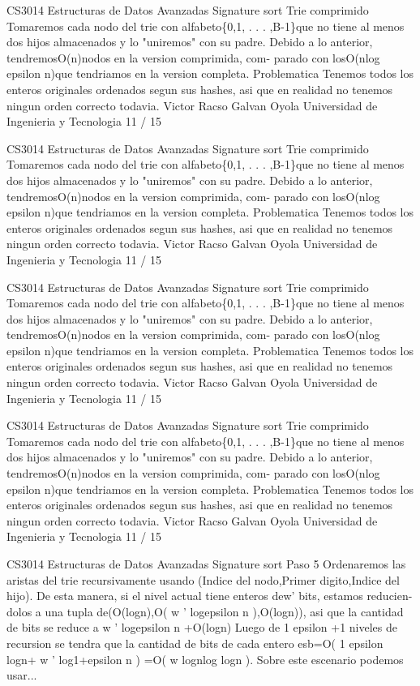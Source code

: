 \begin{description}[leftmargin=!,labelwidth=4.2em,style=nextline]
\item[Pag. 36] CS3014 Estructuras de Datos Avanzadas Signature sort Trie comprimido Tomaremos cada nodo del trie con alfabeto\{0,1, . . . ,B-1\}que no tiene al menos dos hijos almacenados y lo "uniremos" con su padre. Debido a lo anterior, tendremosO(n)nodos en la version comprimida, com- parado con losO(nlog epsilon n)que tendriamos en la version completa. Problematica Tenemos todos los enteros originales ordenados segun sus hashes, asi que en realidad no tenemos ningun orden correcto todavia. Victor Racso Galvan Oyola Universidad de Ingenieria y Tecnologia 11 / 15
\item[Pag. 37] CS3014 Estructuras de Datos Avanzadas Signature sort Trie comprimido Tomaremos cada nodo del trie con alfabeto\{0,1, . . . ,B-1\}que no tiene al menos dos hijos almacenados y lo "uniremos" con su padre. Debido a lo anterior, tendremosO(n)nodos en la version comprimida, com- parado con losO(nlog epsilon n)que tendriamos en la version completa. Problematica Tenemos todos los enteros originales ordenados segun sus hashes, asi que en realidad no tenemos ningun orden correcto todavia. Victor Racso Galvan Oyola Universidad de Ingenieria y Tecnologia 11 / 15
\item[Pag. 38] CS3014 Estructuras de Datos Avanzadas Signature sort Trie comprimido Tomaremos cada nodo del trie con alfabeto\{0,1, . . . ,B-1\}que no tiene al menos dos hijos almacenados y lo "uniremos" con su padre. Debido a lo anterior, tendremosO(n)nodos en la version comprimida, com- parado con losO(nlog epsilon n)que tendriamos en la version completa. Problematica Tenemos todos los enteros originales ordenados segun sus hashes, asi que en realidad no tenemos ningun orden correcto todavia. Victor Racso Galvan Oyola Universidad de Ingenieria y Tecnologia 11 / 15
\item[Pag. 39] CS3014 Estructuras de Datos Avanzadas Signature sort Trie comprimido Tomaremos cada nodo del trie con alfabeto\{0,1, . . . ,B-1\}que no tiene al menos dos hijos almacenados y lo "uniremos" con su padre. Debido a lo anterior, tendremosO(n)nodos en la version comprimida, com- parado con losO(nlog epsilon n)que tendriamos en la version completa. Problematica Tenemos todos los enteros originales ordenados segun sus hashes, asi que en realidad no tenemos ningun orden correcto todavia. Victor Racso Galvan Oyola Universidad de Ingenieria y Tecnologia 11 / 15
\item[Pag. 40] CS3014 Estructuras de Datos Avanzadas Signature sort Paso 5 Ordenaremos las aristas del trie recursivamente usando (Indice del nodo,Primer digito,Indice del hijo). De esta manera, si el nivel actual tiene enteros dew' bits, estamos reducien- dolos a una tupla de(O(logn),O( w ' logepsilon n ),O(logn)), asi que la cantidad de bits se reduce a w ' logepsilon n +O(logn) Luego de 1 epsilon +1 niveles de recursion se tendra que la cantidad de bits de cada entero esb=O( 1 epsilon logn+ w ' log1+epsilon n ) =O( w lognlog logn ). Sobre este escenario podemos usar...

\end{description}
